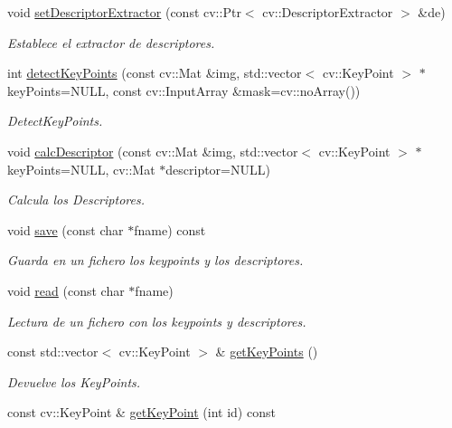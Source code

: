 \begin{DoxyCompactItemize}
void \hyperlink{class_i3_d_1_1_features2_d_a8c34027b40e0be15923e3d18fe668cdd}{set\+Descriptor\+Extractor} (const cv\+::\+Ptr$<$ cv\+::\+Descriptor\+Extractor $>$ \&de)
\begin{DoxyCompactList}\small\item\em Establece el extractor de descriptores. \end{DoxyCompactList}\item 
int \hyperlink{class_i3_d_1_1_features2_d_a62ecf2a0260a7cc171606038e9dff77f}{detect\+Key\+Points} (const cv\+::\+Mat \&img, std\+::vector$<$ cv\+::\+Key\+Point $>$ $\ast$key\+Points=N\+U\+LL, const cv\+::\+Input\+Array \&mask=cv\+::no\+Array())
\begin{DoxyCompactList}\small\item\em Detect\+Key\+Points. \end{DoxyCompactList}\item 
void \hyperlink{class_i3_d_1_1_features2_d_a5da82180382ed94fc8c197ea7f03911b}{calc\+Descriptor} (const cv\+::\+Mat \&img, std\+::vector$<$ cv\+::\+Key\+Point $>$ $\ast$key\+Points=N\+U\+LL, cv\+::\+Mat $\ast$descriptor=N\+U\+LL)
\begin{DoxyCompactList}\small\item\em Calcula los Descriptores. \end{DoxyCompactList}\item 
void \hyperlink{class_i3_d_1_1_features2_d_a9a6855620abadd6571352d3fbfd29381}{save} (const char $\ast$fname) const 
\begin{DoxyCompactList}\small\item\em Guarda en un fichero los keypoints y los descriptores. \end{DoxyCompactList}\item 
void \hyperlink{class_i3_d_1_1_features2_d_ae999316e0882a9c2a29a29e3e5b5e746}{read} (const char $\ast$fname)
\begin{DoxyCompactList}\small\item\em Lectura de un fichero con los keypoints y descriptores. \end{DoxyCompactList}\item 
const std\+::vector$<$ cv\+::\+Key\+Point $>$ \& \hyperlink{class_i3_d_1_1_features2_d_a5543362d3c3d1f1e0072ac1b8090217a}{get\+Key\+Points} ()
\begin{DoxyCompactList}\small\item\em Devuelve los Key\+Points. \end{DoxyCompactList}\item 
const cv\+::\+Key\+Point \& \hyperlink{class_i3_d_1_1_features2_d_a725ae53258ccfd1b6a9d75646d75bba7}{get\+Key\+Point} (int id) const 

\end{DoxyCompactItemize}
